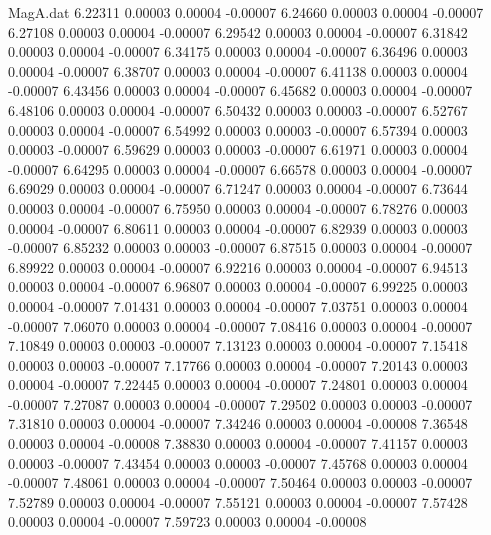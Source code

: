 \begin{filecontents}{MagA.dat}
   6.22311    0.00003    0.00004   -0.00007
   6.24660    0.00003    0.00004   -0.00007
   6.27108    0.00003    0.00004   -0.00007
   6.29542    0.00003    0.00004   -0.00007
   6.31842    0.00003    0.00004   -0.00007
   6.34175    0.00003    0.00004   -0.00007
   6.36496    0.00003    0.00004   -0.00007
   6.38707    0.00003    0.00004   -0.00007
   6.41138    0.00003    0.00004   -0.00007
   6.43456    0.00003    0.00004   -0.00007
   6.45682    0.00003    0.00004   -0.00007
   6.48106    0.00003    0.00004   -0.00007
   6.50432    0.00003    0.00003   -0.00007
   6.52767    0.00003    0.00004   -0.00007
   6.54992    0.00003    0.00003   -0.00007
   6.57394    0.00003    0.00003   -0.00007
   6.59629    0.00003    0.00003   -0.00007
   6.61971    0.00003    0.00004   -0.00007
   6.64295    0.00003    0.00004   -0.00007
   6.66578    0.00003    0.00004   -0.00007
   6.69029    0.00003    0.00004   -0.00007
   6.71247    0.00003    0.00004   -0.00007
   6.73644    0.00003    0.00004   -0.00007
   6.75950    0.00003    0.00004   -0.00007
   6.78276    0.00003    0.00004   -0.00007
   6.80611    0.00003    0.00004   -0.00007
   6.82939    0.00003    0.00003   -0.00007
   6.85232    0.00003    0.00003   -0.00007
   6.87515    0.00003    0.00004   -0.00007
   6.89922    0.00003    0.00004   -0.00007
   6.92216    0.00003    0.00004   -0.00007
   6.94513    0.00003    0.00004   -0.00007
   6.96807    0.00003    0.00004   -0.00007
   6.99225    0.00003    0.00004   -0.00007
   7.01431    0.00003    0.00004   -0.00007
   7.03751    0.00003    0.00004   -0.00007
   7.06070    0.00003    0.00004   -0.00007
   7.08416    0.00003    0.00004   -0.00007
   7.10849    0.00003    0.00003   -0.00007
   7.13123    0.00003    0.00004   -0.00007
   7.15418    0.00003    0.00003   -0.00007
   7.17766    0.00003    0.00004   -0.00007
   7.20143    0.00003    0.00004   -0.00007
   7.22445    0.00003    0.00004   -0.00007
   7.24801    0.00003    0.00004   -0.00007
   7.27087    0.00003    0.00004   -0.00007
   7.29502    0.00003    0.00003   -0.00007
   7.31810    0.00003    0.00004   -0.00007
   7.34246    0.00003    0.00004   -0.00008
   7.36548    0.00003    0.00004   -0.00008
   7.38830    0.00003    0.00004   -0.00007
   7.41157    0.00003    0.00003   -0.00007
   7.43454    0.00003    0.00003   -0.00007
   7.45768    0.00003    0.00004   -0.00007
   7.48061    0.00003    0.00004   -0.00007
   7.50464    0.00003    0.00003   -0.00007
   7.52789    0.00003    0.00004   -0.00007
   7.55121    0.00003    0.00004   -0.00007
   7.57428    0.00003    0.00004   -0.00007
   7.59723    0.00003    0.00004   -0.00008

\end{filecontents}
